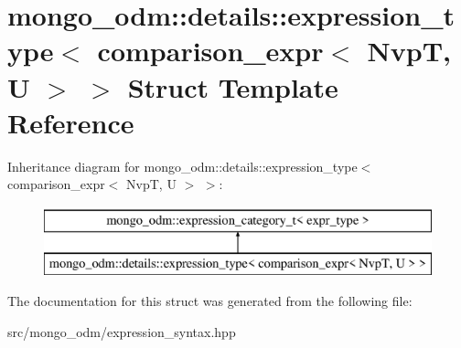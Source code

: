 \hypertarget{structmongo__odm_1_1details_1_1expression__type_3_01comparison__expr_3_01NvpT_00_01U_01_4_01_4}{}\section{mongo\+\_\+odm\+:\+:details\+:\+:expression\+\_\+type$<$ comparison\+\_\+expr$<$ NvpT, U $>$ $>$ Struct Template Reference}
\label{structmongo__odm_1_1details_1_1expression__type_3_01comparison__expr_3_01NvpT_00_01U_01_4_01_4}
Inheritance diagram for mongo\+\_\+odm\+:\+:details\+:\+:expression\+\_\+type$<$ comparison\+\_\+expr$<$ NvpT, U $>$ $>$\+:\begin{figure}[H]
\begin{center}
\leavevmode
\includegraphics[height=2.000000cm]{structmongo__odm_1_1details_1_1expression__type_3_01comparison__expr_3_01NvpT_00_01U_01_4_01_4}
\end{center}
\end{figure}


The documentation for this struct was generated from the following file\+:\begin{DoxyCompactItemize}
\item 
src/mongo\+\_\+odm/expression\+\_\+syntax.\+hpp\end{DoxyCompactItemize}
